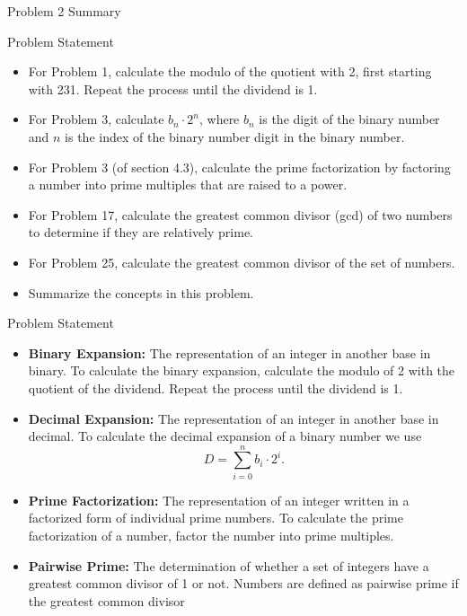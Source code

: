 \begin{summary}{Problem 2 Summary}
    \begin{statement}{Problem Statement}
        \begin{itemize}
            \item For Problem 1, calculate the modulo of the quotient with 2, first starting with 231. Repeat the process until the dividend is 1.
            \item For Problem 3, calculate $b_{n} \cdot 2^{n}$, where $b_{n}$ is the digit of the binary number and $n$ is the index of the binary number digit in the binary number.
            \item For Problem 3 (of section 4.3), calculate the prime factorization by factoring a number into prime multiples that are raised to a power.
            \item For Problem 17, calculate the greatest common divisor (gcd) of two numbers to determine if they are relatively prime.
            \item For Problem 25, calculate the greatest common divisor of the set of numbers.
            \item Summarize the concepts in this problem.
        \end{itemize}
    \end{statement}
    \begin{statement}{Problem Statement}
        \begin{itemize}
            \item \textbf{Binary Expansion:} The representation of an integer in another base in binary. To calculate the binary expansion, calculate the modulo of 2 with the quotient of the dividend.
            Repeat the process until the dividend is 1.
            \item \textbf{Decimal Expansion:} The representation of an integer in another base in decimal. To calculate the decimal expansion of a binary number we use
            \begin{equation*}
                D = \sum_{i = 0}^{n} b_{i} \cdot 2^{i}.
            \end{equation*}
            \item \textbf{Prime Factorization:} The representation of an integer written in a factorized form of individual prime numbers. To calculate the prime factorization of a number, factor the
            number into prime multiples.
            \item \textbf{Pairwise Prime:} The determination of whether a set of integers have a greatest common divisor of 1 or not. Numbers are defined as pairwise prime if the greatest common divisor

\end{itemize}
\end{statement}
\end{summary}
